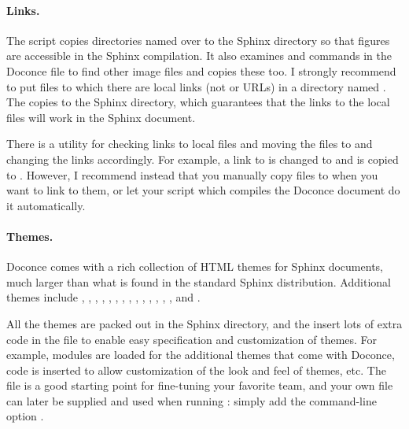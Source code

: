 \documentclass[%
oneside,                 %
final,                   %
10pt]{article}
\begin{document}
{{\paragraph{Links.}
The  script copies directories named 
over to the Sphinx directory so that figures are accessible
in the Sphinx compilation.  It also examines  and 
commands in the Doconce file to find other image files and copies
these too. I strongly recommend to put files
to which there are local links (not  or  URLs) in
a directory named . The  copies
 to the Sphinx directory, which guarantees that the links
to the local files will work in the Sphinx document.

There is a utility  for checking links to
local files and moving the files to  and changing the links
accordingly. For example, a link to  is changed
to  and  is copied to .
However, I recommend instead that you manually copy
files to  when you want to link to them, or let your
script which compiles the Doconce document do it automatically.

\paragraph{Themes.}
Doconce comes with a rich collection of HTML themes for Sphinx documents,
much larger than what is found in the standard Sphinx distribution.
Additional themes include
,
,
,
,
,
,
,
,
,
,
,
,
,
, and
.

All the themes are packed out in the Sphinx directory, and the
 insert lots of extra code in the 
file to enable easy specification and customization of themes.
For example, modules are loaded for the additional themes that
come with Doconce, code is inserted to allow customization of
the look and feel of themes, etc. The  file is a
good starting point for fine-tuning your favorite team, and your
own  file can later be supplied and used when running
: simply add the command-line option
.

}}
\end{document}
